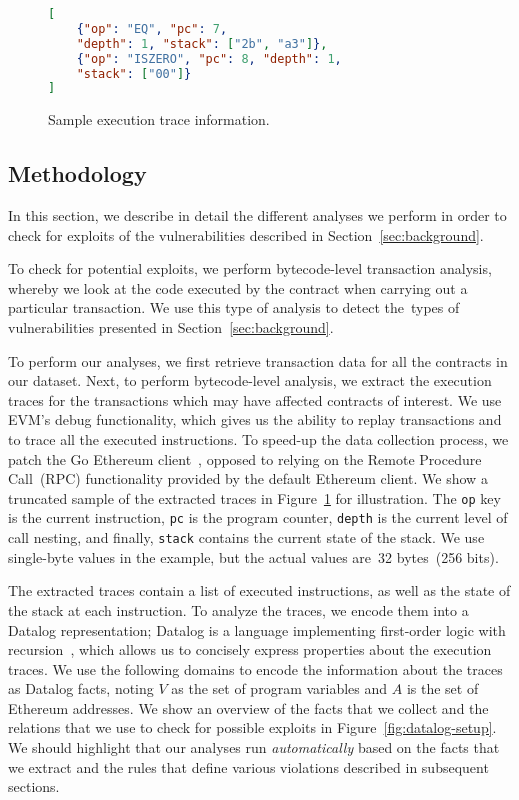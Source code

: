 \begin{figure}[tb]
\begin{lstlisting}[basicstyle=\footnotesize\ttfamily,language=json]
[
    {"op": "EQ", "pc": 7, 
    "depth": 1, "stack": ["2b", "a3"]},
    {"op": "ISZERO", "pc": 8, "depth": 1,
    "stack": ["00"]}
]
\end{lstlisting}
\caption{\label{fig:execution-trace}Sample execution trace information.}
\end{figure}


\subsection{Methodology}
\label{sec:methodology}

In this section, we describe in detail the different analyses we perform in order to check for exploits of the vulnerabilities described in Section~\ref{sec:background}.

To check for potential exploits, we perform bytecode-level transaction analysis, whereby we look at the code executed by the contract when carrying out a particular transaction. We use this type of analysis to detect the~\VulnTypes types of vulnerabilities presented in Section~\ref{sec:background}.

To perform our analyses, we first retrieve transaction data for all the contracts in our dataset. Next, to perform bytecode-level analysis, we extract the execution traces for the transactions which may have affected contracts of interest. We use EVM's debug functionality, which gives us the ability to replay transactions and to trace all the executed instructions. To speed-up the data collection process, we patch the Go Ethereum client~\cite{go-ethereum}, opposed to relying on the Remote Procedure Call~(RPC) functionality provided by the default Ethereum client.
We show a truncated sample of the extracted traces in Figure~\ref{fig:execution-trace} for illustration. 
%
The \lstinline{op} key is the current instruction, \lstinline{pc} is the program counter, \lstinline{depth} is the current level of call nesting, and finally, \lstinline{stack} contains the current state of the stack. We use single-byte values in the example, but the actual values are~32 bytes~(256 bits).

The extracted traces contain a list of executed instructions, as well as the state of the stack at each instruction.
To analyze the traces, we encode them into a Datalog representation; Datalog is a language implementing first-order logic with recursion~\cite{Immerman99descriptivecomplexity}, which allows us to concisely express properties about the execution traces.
We use the following domains to encode the information about the traces as Datalog facts, noting $V$ as the set of program variables and $A$ is the set of Ethereum addresses.
We show an overview of the facts that we collect and the relations that we use to check for possible exploits in Figure~\ref{fig:datalog-setup}.
We should highlight that our analyses run \emph{automatically} based on the facts that we extract and the rules that define various violations described in subsequent sections. 

